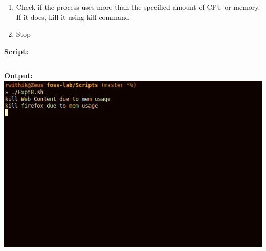 \documentclass[10pt,a4paper,titlepage]{report}
\begin{document}
\begin{enumerate}
\begin{enumerate}
	\item Check if the process uses more than the specified amount of CPU or memory. If it does, kill it using {\color{red}kill} command
	\item Stop
\end{enumerate}
\textbf{Script:}\newline
\inputminted{bash}{../Scripts/Set1/Expt8.sh}
\textbf{Output:}\newline
\includegraphics[width=\linewidth]{../Images/Shell1/5.png}
\end{enumerate}
\end{document}
